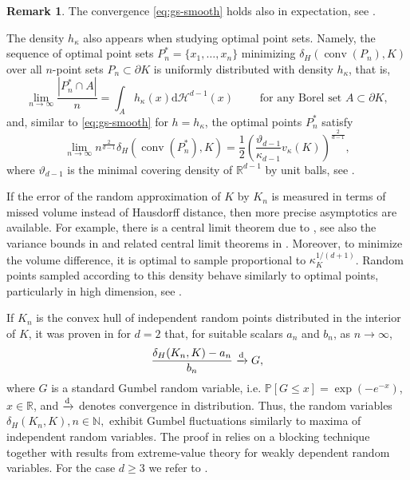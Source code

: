 \documentclass[a4paper,12pt,reqno]{amsart}
\theoremstyle{definition}
\newtheorem{remark}{Remark}
\newcommand{\IN}{\mathbb{N}}
\newcommand{\IP}{\mathbb{P}}
\newcommand{\IR}{\mathbb{R}}
\newcommand{\cH}{\mathcal{H}}
\DeclareMathOperator{\conv}{conv}
\newcommand{\dd}{\mathrm{d}}
\begin{document}
\begin{remark}
The convergence \eqref{eq:gs-smooth} holds also in expectation, see \cite{DW96,PSS+24}. 
\end{remark}

The density $h_{\kappa}$  also appears when studying optimal point sets. Namely, the sequence of optimal point sets $P_n^*=\{x_1,\dots,x_n\}$ minimizing $\delta_H(\conv(P_n),K)$ over all $n$-point sets $P_n\subset \partial K$ is uniformly distributed with density $h_{\kappa}$, that is, 
\[
\lim_{n\to \infty}\frac{|P_n^*\cap A|}{n} =\int_A h_{\kappa}(x)\dd\cH^{d-1}(x)\qquad \text{ for any Borel set }A\subset \partial K,
\]
and, similar to \eqref{eq:gs-smooth} for $h=h_{\kappa}$, the optimal points $P_n^*$ satisfy 
\[
\lim_{n\to \infty}n^{\frac{2}{d-1}}\delta_H(\conv(P_n^*),K)
=\frac{1}{2}\left( \frac{\vartheta_{d-1}}{\kappa_{d-1}}v_{\kappa}(K)
\right)^{\frac{2}{d-1}},
\]
where $\vartheta_{d-1}$ is the minimal covering density of $\IR^{d-1}$ by unit balls, see \cite{GS96,Gru93,Sch81}. 

If the error of the random approximation of $K$ by $K_n$ is measured in terms of missed volume instead of Hausdorff distance, then more precise asymptotics are available. For example, there is a central limit theorem due to \cite{Tha18}, see also the variance bounds in \cite{Rei03,RVW08} and related central limit theorems in \cite{BR10,BT20,CSY13,Hsi94,LSY19,Rei05,TTW18,Vu06}. Moreover, to minimize the volume difference, it is optimal to sample proportional to $\kappa_K^{1/(d+1)}$. Random points sampled according to this density behave similarly to optimal points, particularly in high dimension, see \cite{PSW22,Rei02,SW03}.

If $K_n$ is the convex hull of independent random points distributed in the interior of $K$, it was proven in \cite{BHB98} for $d=2$ that, for suitable scalars $a_n$ and $b_n$, as $n\to \infty$,
\begin{equation} \label{eq:extreme-limit}
	\frac{\delta_{H}(K_n,K)-a_n}{b_n}\xrightarrow[]{\rm d} G,
\end{equation}
where $G$ is a standard Gumbel random variable, i.e. $\IP[G\le x]=\exp(-e^{-x})$, $x\in \IR$, and $\xrightarrow[]{\rm d}$ denotes convergence in distribution. Thus, the random variables $\delta_H(K_n,K), n\in \IN,$ exhibit Gumbel fluctuations similarly to maxima of independent random variables. The proof in \cite{BHB98} relies on a blocking technique together with results from extreme-value theory for weakly dependent random variables. For the case $d\ge 3$ we refer to \cite{CY25+}.
\end{document}
